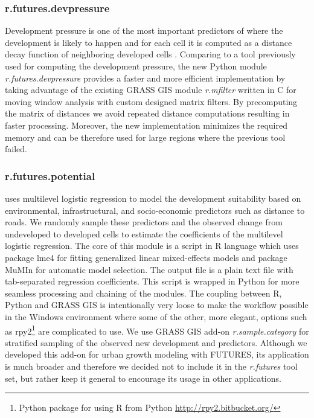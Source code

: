 \documentclass{isprs}
\begin{document}
\subsubsection{r.futures.devpressure}
Development pressure is one of the most
important predictors of where
the development is likely to happen
and for each cell it is computed as a distance decay function of neighboring
developed cells \cite{Meentemeyer2012}.
Comparing to a tool previously used for computing the development pressure,
the new Python module \emph{r.futures.devpressure} provides a faster and more efficient 
implementation by taking advantage of the existing GRASS GIS 
module \emph{r.mfilter} written in C for moving window analysis with custom designed matrix filters.
By precomputing the matrix of distances we avoid repeated distance computations
resulting in faster processing. Moreover, the new implementation
minimizes the required memory and can be therefore used for
large regions where the previous tool failed.

\subsubsection{r.futures.potential}
uses multilevel logistic regression  to model the development
suitability based on environmental, infrastructural, and socio-economic predictors such as distance to roads.
We randomly sample these predictors and the observed change from undeveloped to developed cells
to estimate the coefficients of the multilevel logistic regression.
The core of this
module is a script in R language \cite{rstats} which uses package lme4 \cite{lme4}
for fitting generalized linear mixed-effects models and package MuMIn \cite{mumin}
for automatic model selection.
The output file is a plain text file with tab-separated regression coefficients.
This script is wrapped in Python for more seamless processing
and chaining of the modules. 
The coupling between R, Python and GRASS GIS
is intentionally very loose to make the workflow possible in the Windows environment
where some of the other, more elegant, options such as
rpy2\footnote{Python package for using R from Python \url{http://rpy2.bitbucket.org/}} are complicated to use.
We use GRASS GIS add-on \emph{r.sample.category} for stratified sampling of the observed new development and predictors.
Although we developed this add-on for urban growth modeling with FUTURES,
its application is much broader and therefore we decided not to include
it in the \emph{r.futures} tool set, but rather keep it general to encourage its usage
in other applications.
\end{document}
